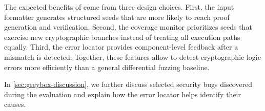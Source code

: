 The expected benefits of \greyboxfuzz come from three design choices. First, the input formatter generates structured seeds that are more likely to reach proof generation and verification. Second, the coverage monitor prioritizes seeds that exercise new cryptographic branches instead of treating all execution paths equally. Third, the error locator provides component-level feedback after a mismatch is detected. Together, these features allow \greyboxfuzz to detect cryptographic logic errors more efficiently than a general differential fuzzing baseline.


In \autoref{sec:greybox-discussion}, we further discuss selected security bugs discovered during the evaluation and explain how the error locator helps identify their causes.